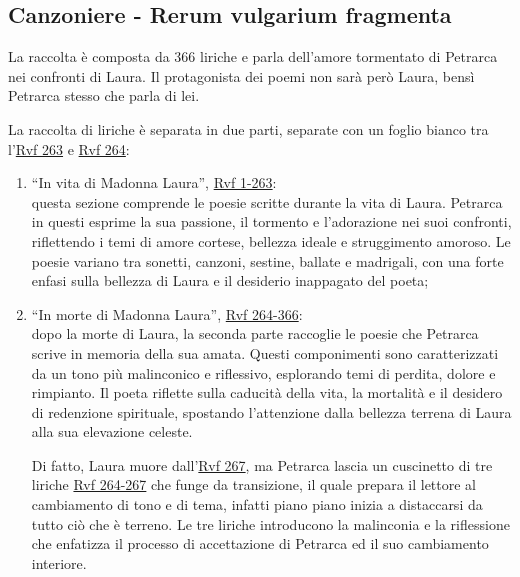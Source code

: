 \documentclass{article}
\begin{document}
\subsection{Canzoniere - Rerum vulgarium fragmenta}
La raccolta è composta da 366 liriche e parla dell'amore tormentato di Petrarca nei confronti
di Laura. Il protagonista dei poemi non sarà però Laura, bensì Petrarca stesso che parla di lei.

La raccolta di liriche è separata in due parti, separate con un foglio bianco tra
l'\underline{Rvf 263} e \underline{Rvf 264}:
\begin{enumerate}[label=Parte \arabic*.]
    \item ``In vita di Madonna Laura'', \underline{Rvf 1-263}:\\
        questa sezione comprende le poesie scritte durante la vita di Laura. Petrarca in questi
        esprime la sua passione, il tormento e l'adorazione nei suoi confronti, riflettendo i
        temi di amore cortese, bellezza ideale e struggimento amoroso. Le poesie variano tra
        sonetti, canzoni, sestine, ballate e madrigali, con una forte enfasi sulla bellezza di
        Laura e il desiderio inappagato del poeta;
    \item ``In morte di Madonna Laura'', \underline{Rvf 264-366}:\\
        dopo la morte di Laura, la seconda parte raccoglie le poesie che Petrarca scrive in
        memoria della sua amata. Questi componimenti sono caratterizzati da un tono più
        malinconico e riflessivo, esplorando temi di perdita, dolore e rimpianto. Il poeta
        riflette sulla caducità della vita, la mortalità e il desidero di redenzione spirituale,
        spostando l'attenzione dalla bellezza terrena di Laura alla sua elevazione celeste.

        Di fatto, Laura muore dall'\underline{Rvf 267}, ma Petrarca lascia un cuscinetto di
        tre liriche \underline{Rvf 264-267} che funge da transizione, il quale prepara il
        lettore al cambiamento di tono e di tema, infatti piano piano inizia a distaccarsi da
        tutto ciò che è terreno. Le tre liriche introducono la malinconia e la riflessione che
        enfatizza il processo di accettazione di Petrarca ed il suo cambiamento interiore.
\end{enumerate}

\newpage
\end{document}
